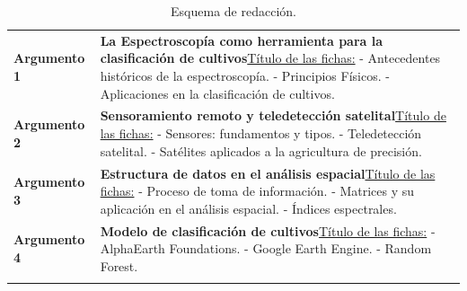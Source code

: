 \begin{table}[h!]
\begin{tabular}{|M{4cm}|J{12cm}|}
    \hline
     \\
    \hline
    \textbf{Argumento 1} & \textbf{La Espectroscopía como herramienta para la clasificación de cultivos}\newline \underline{Título de las fichas:}\newline 
      - Antecedentes históricos de la espectroscopía.\newline
      - Principios Físicos. \newline
      - Aplicaciones en la clasificación de cultivos. \\
    \hline
    \textbf{Argumento 2} & \textbf{Sensoramiento remoto y teledetección satelital}\newline \underline{Título de las fichas:}\newline 
      - Sensores: fundamentos y tipos.\newline
      - Teledetección satelital.\newline
      - Satélites aplicados a la agricultura de precisión. \\
    \hline
    \textbf{Argumento 3} & \textbf{Estructura de datos en el análisis espacial}\newline \underline{Título de las fichas:}\newline 
      - Proceso de toma de información.\newline
      - Matrices y su aplicación en el análisis espacial.\newline
      - Índices espectrales. \\
    \hline
    \textbf{Argumento 4} & \textbf{Modelo de clasificación de cultivos}\newline \underline{Título de las fichas:}\newline 
      - AlphaEarth Foundations.\newline
      - Google Earth Engine.\newline
      - Random Forest. \\
    \hline
     \\
    \hline
  \end{tabular}
  \caption{Esquema de redacción.}
  \label{tab:esquema_redaccion_introduccion}
\end{table}

